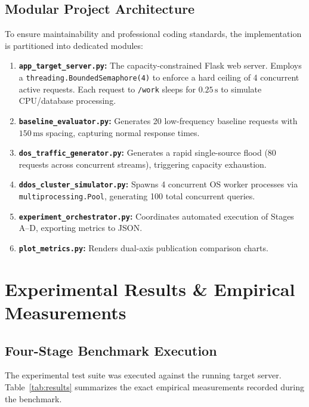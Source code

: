 \documentclass[11pt,a4paper]{article}
\begin{document}
\subsection{Modular Project Architecture}
To ensure maintainability and professional coding standards, the implementation is partitioned into dedicated modules:

\begin{enumerate}[leftmargin=*]
    \item \textbf{\texttt{app\_target_server.py}:} The capacity-constrained Flask web server. Employs a \texttt{threading.BoundedSemaphore(4)} to enforce a hard ceiling of 4 concurrent active requests. Each request to \texttt{/work} sleeps for $0.25\,\text{s}$ to simulate CPU/database processing.
    \item \textbf{\texttt{baseline_evaluator.py}:} Generates 20 low-frequency baseline requests with $150\,\text{ms}$ spacing, capturing normal response times.
    \item \textbf{\texttt{dos_traffic_generator.py}:} Generates a rapid single-source flood (80 requests across concurrent streams), triggering capacity exhaustion.
    \item \textbf{\texttt{ddos_cluster_simulator.py}:} Spawns 4 concurrent OS worker processes via \texttt{multiprocessing.Pool}, generating 100 total concurrent queries.
    \item \textbf{\texttt{experiment_orchestrator.py}:} Coordinates automated execution of Stages A--D, exporting metrics to JSON.
    \item \textbf{\texttt{plot_metrics.py}:} Renders dual-axis publication comparison charts.
\end{enumerate}

\section{Experimental Results \& Empirical Measurements}

\subsection{Four-Stage Benchmark Execution}
The experimental test suite was executed against the running target server. Table~\ref{tab:results} summarizes the exact empirical measurements recorded during the benchmark.
\end{document}
